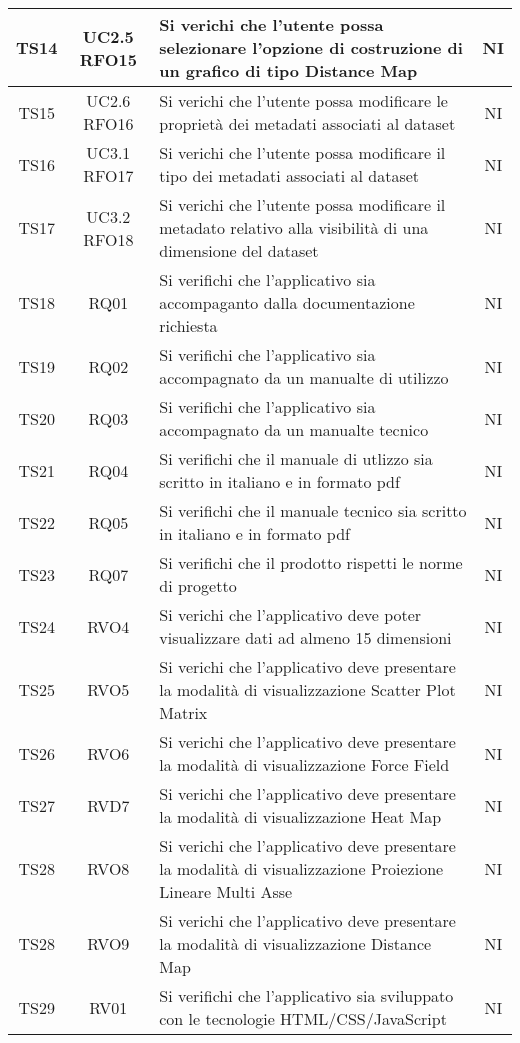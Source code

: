 \documentclass[../piano_di_qualifica.tex]{subfiles}
\begin{document}
\begin{center}
\begin{longtable}{|c|c|p{8.5cm}|c|}
		TS14  & UC2.5 RFO15 & Si verichi che l'utente possa selezionare l’opzione di costruzione di un grafico di tipo Distance Map & NI \\ \hline
		TS15 & UC2.6 RFO16 & Si verichi che l'utente possa modificare le proprietà dei metadati associati al dataset  & NI \\ \hline
		TS16 & UC3.1 RFO17 & Si verichi che l'utente possa modificare il tipo dei metadati associati al dataset & NI \\ \hline
		TS17 & UC3.2 RFO18 & Si verichi che l'utente possa modificare il metadato relativo alla visibilità di una dimensione del dataset & NI \\ \hline
		TS18  & RQ01  & Si verifichi che l'applicativo sia accompaganto dalla documentazione richiesta   & NI \\ \hline
      		TS19  & RQ02  & Si verifichi che l'applicativo sia accompagnato da un manualte di utilizzo  & NI \\ \hline
      		TS20  & RQ03  & Si verifichi che l'applicativo sia accompagnato da un manualte tecnico    & NI \\ \hline
      		TS21  & RQ04  & Si verifichi che il manuale di utlizzo sia scritto in italiano e in formato pdf     & NI \\ \hline
      		TS22  & RQ05  & Si verifichi che il manuale tecnico sia scritto in italiano e in formato pdf  & NI \\ \hline
      		TS23  & RQ07  & Si verifichi che il prodotto rispetti le norme di progetto    & NI \\   \hline
		TS24  & RVO4 & Si verichi che l’applicativo deve poter visualizzare dati ad almeno 15 dimensioni & NI \\ \hline
		TS25  & RVO5 & Si verichi che l’applicativo deve presentare la modalità di visualizzazione Scatter Plot Matrix & NI \\ \hline
		TS26  & RVO6 & Si verichi che l’applicativo deve presentare la modalità di visualizzazione Force Field & NI \\ \hline
		TS27  & RVD7 & Si verichi che l’applicativo deve presentare la modalità di visualizzazione Heat Map & NI \\ \hline
		TS28  & RVO8 & Si verichi che l’applicativo deve presentare la modalità di visualizzazione Proiezione Lineare Multi Asse & NI \\ \hline
		TS28  & RVO9 & Si verichi che l’applicativo deve presentare la modalità di visualizzazione Distance Map & NI \\ \hline
		TS29   & RV01  & Si verifichi che l'applicativo sia sviluppato con le tecnologie HTML/CSS/JavaScript  & NI \\ \hline

\end{longtable}
\end{center}
\end{document}
